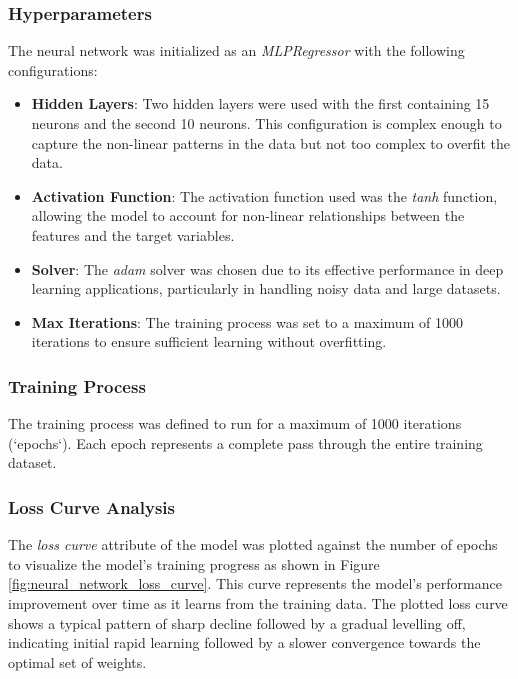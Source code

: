 \subsubsection*{Hyperparameters} The neural network was initialized as an \textit{MLPRegressor} with the following configurations:

\begin{itemize}
    \item \textbf{Hidden Layers}: Two hidden layers were used with the first containing 15 neurons and the second 10 neurons. This configuration is complex enough to capture the non-linear patterns in the data but
          not too complex to overfit the data.
    \item \textbf{Activation Function}: The activation function used was the \textit{tanh} function, allowing the model to account for non-linear relationships between the features and the target variables.
    \item \textbf{Solver}: The \textit{adam} solver was chosen due to its effective performance in deep learning applications, particularly in handling noisy data and large datasets.
    \item \textbf{Max Iterations}: The training process was set to a maximum of 1000 iterations to ensure sufficient learning without overfitting.
\end{itemize}

\subsubsection*{Training Process} The training process was defined to run for a maximum of 1000 iterations (`epochs`). Each epoch represents a complete pass through the entire training dataset.

\subsubsection*{Loss Curve Analysis} The \textit{loss curve} attribute of the model was plotted against the number of epochs to visualize the model's training progress as shown in Figure
\ref{fig:neural_network_loss_curve}. This curve represents the model's performance improvement over time as it learns from the training data. The plotted loss curve shows a typical pattern
of sharp decline followed by a gradual levelling off, indicating initial rapid learning followed by a slower convergence towards the optimal set of weights.

